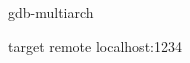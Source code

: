 \documentclass[../monografia.tex]{subfiles}
\begin{document}
\clearpage

gdb-multiarch

target remote localhost:1234
\end{document}
